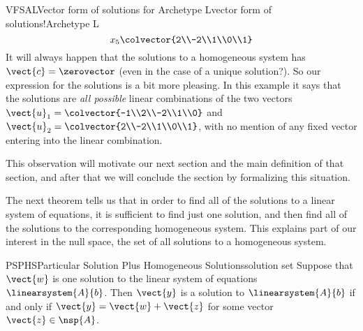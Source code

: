 \begin{example}{VFSAL}{Vector form of solutions for Archetype L}{vector form of solutions!Archetype L}
\begin{equation*}
x_5\colvector{2\\-2\\1\\0\\1}
\end{equation*}
%
It will always happen that the solutions to a homogeneous system has $\vect{c}=\zerovector$ (even in the case of a unique solution?).  So our expression for the solutions is a bit more pleasing.  In this example it says that the solutions are {\em all possible} linear combinations of the two vectors $\vect{u}_1=\colvector{-1\\2\\-2\\1\\0}$ and $\vect{u}_2=\colvector{2\\-2\\1\\0\\1}$, with no mention of any fixed vector entering into the linear combination.\par
%
This observation will motivate our next section and the main definition of that section, and after that we will conclude the section by formalizing this situation.
%
\end{example}
%
%
%
The next theorem tells us that in order to find all of the solutions to a linear system of equations, it is sufficient to find just one solution, and then find all of the solutions to the corresponding homogeneous system.  This explains part of our interest in the null space, the set of all solutions to a homogeneous system.
%
\begin{theorem}{PSPHS}{Particular Solution Plus Homogeneous Solutions}{solution set}
Suppose that $\vect{w}$ is one solution to the linear system of equations $\linearsystem{A}{b}$.  Then $\vect{y}$ is a solution to $\linearsystem{A}{b}$ if and only if $\vect{y}=\vect{w}+\vect{z}$ for some vector $\vect{z}\in\nsp{A}$.
\end{theorem}
%

